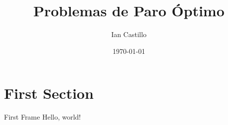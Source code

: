 \documentclass[10pt]{beamer}
\title{Problemas de Paro Óptimo}
\date{\today}
\author{Ian Castillo}
\institute{Facultad de Estudios Superiores Acatlán}
\begin{document}
  \maketitle
  \section{First Section}
  \begin{frame}{First Frame}
    Hello, world!
  \end{frame}
\end{document}
